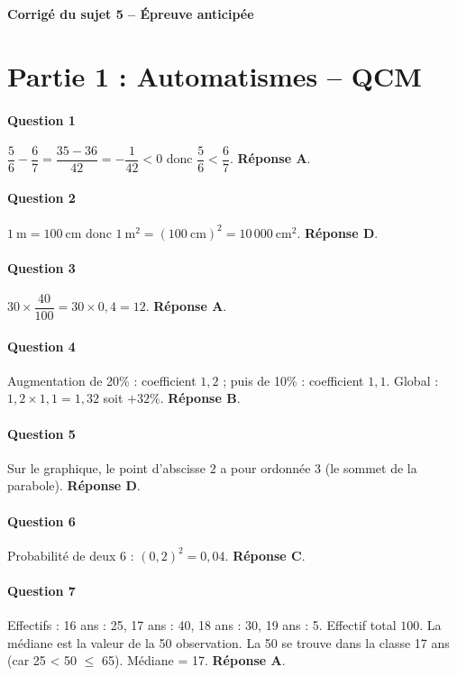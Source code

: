 \documentclass[a4paper, 12pt]{article}
\begin{document}
\begin{center}\Large\textbf{Corrigé du sujet 5 – Épreuve anticipée}\end{center}

\section*{Partie 1 : Automatismes – QCM}

\paragraph{Question 1}
$\dfrac{5}{6} - \dfrac{6}{7} = \dfrac{35-36}{42} = -\dfrac{1}{42} < 0$ donc $\dfrac{5}{6} < \dfrac{6}{7}$. \textbf{Réponse A}.

\paragraph{Question 2}
$1\ \text{m} = 100\ \text{cm}$ donc $1\ \text{m}^2 = (100\ \text{cm})^2 = 10\,000\ \text{cm}^2$. \textbf{Réponse D}.

\paragraph{Question 3}
$30 \times \dfrac{40}{100} = 30 \times 0,4 = 12$. \textbf{Réponse A}.

\paragraph{Question 4}
Augmentation de 20\% : coefficient $1,2$ ; puis de 10\% : coefficient $1,1$. Global : $1,2\times 1,1 = 1,32$ soit $+32\%$. \textbf{Réponse B}.

\paragraph{Question 5}
Sur le graphique, le point d’abscisse $2$ a pour ordonnée $3$ (le sommet de la parabole). \textbf{Réponse D}.

\paragraph{Question 6}
Probabilité de  deux  6 : $(0,2)^2 = 0,04 $. \textbf{Réponse C}.

\paragraph{Question 7}
Effectifs : 16 ans : 25, 17 ans : 40, 18 ans : 30, 19 ans : 5. Effectif total $100$. La médiane est la valeur de la 50\ieme{} observation. La 50\ieme{} se trouve dans la classe 17 ans (car 25 < 50 $\le$ 65). Médiane = 17. \textbf{Réponse A}.
\end{document}
